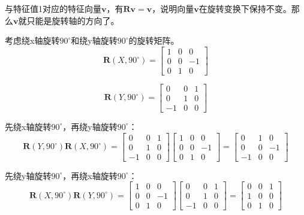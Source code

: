 \documentclass{homework}
\begin{document}
\question 

\begin{sol}
  与特征值1对应的特征向量$ \mathbf{v} $，有$ \mathbf{R} \mathbf{v} = \mathbf{v} $，说明向量$ \mathbf{v} $在旋转变换下保持不变。那么$ \mathbf{v} $就只能是旋转轴的方向了。
  
\end{sol}

\question 

\begin{sol}
  考虑绕x轴旋转$ 90^\circ $和绕y轴旋转$ 90^\circ $的旋转矩阵。
  \[
    \mathbf{R}(X, 90^\circ) =
      \begin{bmatrix}
        1 & 0 & 0 \\
        0 & 0 & -1 \\
        0 & 1 & 0
      \end{bmatrix} 
  \]

  \[
    \mathbf{R}(Y, 90^\circ) =
      \begin{bmatrix}
        0 & 0 & 1 \\
        0 & 1 & 0 \\
        -1 & 0 & 0
      \end{bmatrix} 
  \]

  先绕x轴旋转$ 90^\circ $，再绕y轴旋转$ 90^\circ $：
  \[
    \mathbf{R}(Y, 90^\circ) \mathbf{R}(X, 90^\circ) =
      \begin{bmatrix}
        0 & 0 & 1 \\
        0 & 1 & 0 \\
        -1 & 0 & 0
      \end{bmatrix} 
      \begin{bmatrix}
        1 & 0 & 0 \\
        0 & 0 & -1 \\
        0 & 1 & 0
      \end{bmatrix} = 
      \begin{bmatrix}
        0 & 1 & 0 \\
        0 & 0 & -1 \\
        -1 & 0 & 0
      \end{bmatrix}
  \]

  先绕y轴旋转$ 90^\circ $，再绕x轴旋转$ 90^\circ $：
  \[
    \mathbf{R}(X, 90^\circ) \mathbf{R}(Y, 90^\circ) =
      \begin{bmatrix}
        1 & 0 & 0 \\
        0 & 0 & -1 \\
        0 & 1 & 0
      \end{bmatrix}
      \begin{bmatrix}
        0 & 0 & 1 \\
        0 & 1 & 0 \\
        -1 & 0 & 0
      \end{bmatrix} =
      \begin{bmatrix}
        0 & 0 & 1 \\
        1 & 0 & 0 \\
        0 & 1 & 0
      \end{bmatrix}
  \]


\end{sol}
\end{document}
